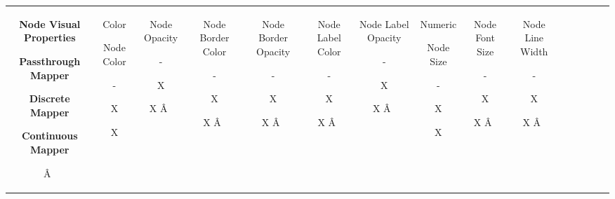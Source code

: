 \begin{tabular}{|c|c|c|c|c|c|c|c|c|c|c|c|c|c|c|}
\hline 
 & & & & & & & & & & & & & & \\
 \hline 


 \textbf{Node Visual Properties}



 \textbf{Passthrough Mapper}



 \textbf{Discrete Mapper}



 \textbf{Continuous Mapper}

\^A  &

 Color


  Node Color 


  - 


  X 


  X 
 &

  Node Opacity 


  - 


  X 


  X 
\^A  &

  Node Border Color 


  - 


  X 


  X 
\^A  &

  Node Border Opacity 


  - 


  X 


  X 
\^A  &

  Node Label Color 


  - 


  X 


  X 
\^A  &

  Node Label Opacity 


  - 


  X 


  X 
\^A  &

 Numeric 


  Node Size 


  - 


  X 


  X 
 &

  Node Font Size 


  - 


  X 


  X 
\^A  &

  Node Line Width 


  - 


  X 


  X 
\^A  &


\end{tabular}

